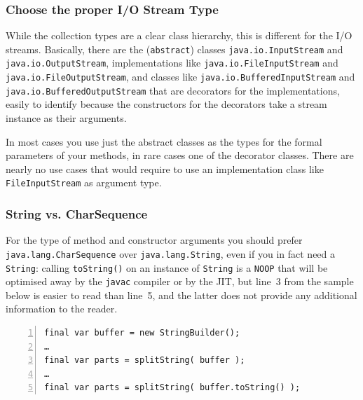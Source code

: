
\subsubsection{Choose the proper I/O Stream Type}\label{sec:ChooseTheProperIOStreamType}
While the collection types are a clear class hierarchy, this is different for the I/O streams. Basically, there are the (\lstinline|abstract|) classes \lstinline|java.io.InputStream|\autocite{ORACLE_DOC_INPUTSTREAM_CLASS} and \lstinline|java.io.OutputStream|\autocite{ORACLE_DOC_OUTPUTSTREAM_CLASS}, implementations like \lstinline|java.io.FileInputStream|\autocite{ORACLE_DOC_FILEINPUTSTREAM_CLASS} and \lstinline|java.io.FileOutputStream|\autocite{ORACLE_DOC_FILEOUTPUTSTREAM_CLASS}, and classes like \lstinline|java.io.BufferedInputStream|\autocite{ORACLE_DOC_BUFFEREDINPUTSTREAM_CLASS} and \lstinline|java.io.BufferedOutputStream|\autocite{ORACLE_DOC_BUFFEREDOUTPUTSTREAM_CLASS} that are decorators for the implementations, easily to identify because the constructors for the decorators take a stream instance as their arguments.

In most cases you use just the abstract classes as the types for the formal parameters of your methods, in rare cases one of the decorator classes. There are nearly no use cases that would require to use an implementation class like \lstinline|FileInputStream| as argument type.

\subsubsection{String vs. CharSequence}
For the type of method and constructor arguments you should prefer \lstinline|java.lang.CharSequence|\autocite{ORACLE_DOC_CHARSEQUENCE_INTERFACE} over \lstinline|java.lang.String|\autocite{ORACLE_DOC_STRING_CLASS}, even if you in fact need a \lstinline|String|: calling \lstinline|toString()| on an instance of \lstinline|String| is a \verb#NOOP# that will be optimised away by the \verb#javac# compiler or by the JIT, but line~3 from the sample below is easier to read than line~5, and the latter does not provide any additional information to the reader.
\begin{lstlisting}[numbers=left]
final var buffer = new StringBuilder();
…
final var parts = splitString( buffer );
…
final var parts = splitString( buffer.toString() );
\end{lstlisting}

